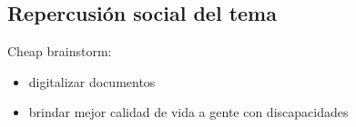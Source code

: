	\newpage
	\subsection{Repercusión social del tema}
		\label{sec:repercusion_social}
		Cheap brainstorm:
		\begin{itemize}
		 \item digitalizar documentos
		 \item brindar mejor calidad de  vida a gente con discapacidades
		 
		\end{itemize}
